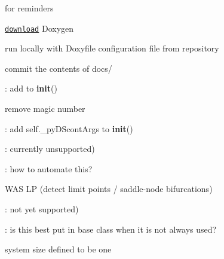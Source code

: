 
\begin{DoxyRefList}
\item[\label{todo__todo000046}%
\Hypertarget{todo__todo000046}%
Page \hyperlink{md__r_e_a_d_m_e}{Mu\+MoT} ]for reminders
\begin{DoxyItemize}
\item \href{http://www.stack.nl/~dimitri/doxygen/download.html}{\tt download} Doxygen
\item run locally with {\ttfamily Doxyfile} configuration file from repository
\item commit the contents of {\ttfamily docs/} 
\end{DoxyItemize}
\item[\label{todo__todo000038}%
\Hypertarget{todo__todo000038}%
Global \hyperlink{class_mu_mo_t_1_1_mu_mo_tbifurcation_view_a797e92fe19ce2636a49bf1400a69fc49}{Mu\+Mo\+Tbifurcation\+View.\+\_\+py\+D\+Scont} ]\+: add to {\bfseries init}() 

remove magic number  
\item[\label{todo__todo000032}%
\Hypertarget{todo__todo000032}%
Global \hyperlink{class_mu_mo_t_1_1_mu_mo_tbifurcation_view_aa56e2cffc879be68fdec55f29334415c}{Mu\+Mo\+Tbifurcation\+View.\+\_\+py\+D\+Scont\+Args} ]\+: add self.\+\_\+py\+D\+Scont\+Args to {\bfseries init}()  
\item[\label{todo__todo000031}%
\Hypertarget{todo__todo000031}%
Global \hyperlink{class_mu_mo_t_1_1_mu_mo_tbifurcation_view_ad2f8dc44173a16468bd9d3ab335f9b27}{Mu\+Mo\+Tbifurcation\+View.\+\_\+state\+Variable3} ]\+: currently unsupported)  
\item[\label{todo__todo000033}%
\Hypertarget{todo__todo000033}%
Global \hyperlink{class_mu_mo_t_1_1_mu_mo_tbifurcation_view_a0a7557ffe670b6a318afa8bd9851d2fc}{Mu\+Mo\+Tbifurcation\+View.Max\+Step\+Size} ]\+: how to automate this?  
\item[\label{todo__todo000034}%
\Hypertarget{todo__todo000034}%
Global \hyperlink{class_mu_mo_t_1_1_mu_mo_tbifurcation_view_a040a7ecbcbaca807aeaec6d5c81801d5}{Mu\+Mo\+Tbifurcation\+View.Save\+Eigen} ]W\+AS \textquotesingle{}LP\textquotesingle{} (detect limit points / saddle-\/node bifurcations)  
\item[\label{todo__todo000035}%
\Hypertarget{todo__todo000035}%
Global \hyperlink{class_mu_mo_t_1_1_mu_mo_tbifurcation_view_afcc7a4b78ecd8fa7e713f8cfa0f51017}{Mu\+Mo\+Tbifurcation\+View.value} ]\+: not yet supported)  
\item[\label{todo__todo000018}%
\Hypertarget{todo__todo000018}%
Global \hyperlink{class_mu_mo_t_1_1_mu_mo_tcontroller_a018864aa22d2adb0d3958fb0adbce8e2}{Mu\+Mo\+Tcontroller.\+\_\+progress\+Bar} ]\+: is this best put in base class when it is not always used?  
\item[\label{todo__todo000023}%
\Hypertarget{todo__todo000023}%
Global \hyperlink{class_mu_mo_t_1_1_mu_mo_tfield_view_a0f5fba57766067c941f5a96b22545ed4}{Mu\+Mo\+Tfield\+View.\+\_\+\+Xdot} ]system size defined to be one 


\end{DoxyRefList}
